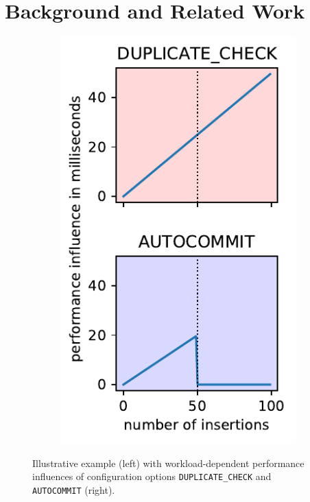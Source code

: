 \section{Background and Related Work}

\begin{figure}
	\begin{subfigure}[l]{0.63\linewidth}
		
	\end{subfigure}
	\hfill
	\begin{subfigure}[l]{0.35\linewidth}
		\includegraphics[width=1\linewidth]{images/influences.pdf}
	\end{subfigure}
	\caption{Illustrative example (left) with workload-dependent performance influences of configuration options \texttt{DUPLICATE\_CHECK} and \texttt{AUTOCOMMIT} (right).}
	\label{fig:intro}
\end{figure}

